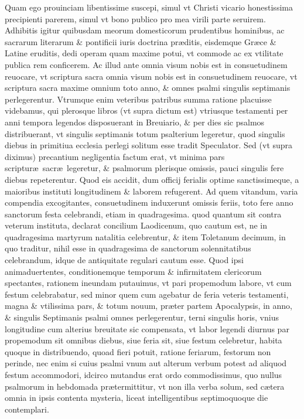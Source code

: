\documentclass[a5paper,10pt]{book}
\def\ae{æ}
\begin{document}
Quam ego prouinciam libentissime suscepi, simul vt Christi vicario honestissima precipienti parerem, simul vt bono publico pro mea virili parte seruirem.
Adhibitis igitur quibusdam meorum domesticorum prudentibus hominibus, ac sacrarum literarum \& pontificii iuris doctrina pr\ae ditis, eisdemque Gr\ae ce \& Latine eruditis, dedi operam quam %
maxime potui, vt commode ac ex vtilitate publica rem conficerem.
Ac illud ante omnia visum nobis est in consuetudinem reuocare, vt scriptura sacra omnia visum nobis est in consuetudinem reuocare, vt scriptura sacra maxime omnium toto anno, \& omnes %
psalmi singulis septimanis perlegerentur.%
Vtrumque enim veteribus patribus summa ratione placuisse videbamus, qui plerosque libros (vt supra dictum est) vtriusque testamenti per anni tempora legendos disposuerant in Breuiario, \& per dies sic psalmos distribuerant, vt singulis septimanis
totum psalterium legeretur, quod singulis diebus in primitiua ecclesia perlegi solitum esse tradit Speculator.
Sed (vt supra diximus) precantium negligentia factum erat, vt minima pars scriptur\ae \ sacr\ae \ legeretur, \& psalmorum plerisque omissis, pauci singulis fere diebus repeterentur.
Quod eis accidit, dum officij ferialis optime sanctissimeque, a maioribus instituti longitudinem \& laborem refugerent.
Ad quem vitandum, varia compendia excogitantes, consuetudinem induxerunt omissis feriis, toto fere anno sanctorum %
festa celebrandi, etiam in quadragesima.
quod %
quantum sit contra veterum instituta, declarat concilium Laodicenum, quo cautum est, ne in quadragesima martyrum natalitia celebrentur, \& item Toletanum decimum, in quo traditur, nihil esse in quadragesima de sanctorum %
solennitatibus %
celebrandum, idque de antiquitate regulari cautum esse.
Quod ipsi animaduertentes, conditionemque temporum \& infirmitatem clericorum spectantes, rationem ineundam putauimus, vt pari propemodum labore, vt cum festum celebrabatur, sed minor quem %
cum agebatur de feria veteris testamenti, magna \& vtilissima pars, \& totum nouum, pr\ae ter partem Apocalypsis, in anno, \& singulis Septimanis psalmi omnes perlegerentur, terni singulis horis, vnius longitudine cum alterius breuitate sic compensata, vt labor legendi diurnus par propemodum sit omnibus diebus, siue feria sit, siue festum celebretur, habita quoque in distribuendo, quoad fieri potuit, ratione feriarum, festorum non perinde, nec enim si cuius psalmi vnum aut alterum verbum potest ad aliquod festum accommodori, idcirco mutandus erat ordo commodissimus, quo nullus psalmorum in hebdomada pr\ae termittitur, vt non illa verba solum, sed c\ae tera omnia in ipsis contenta mysteria, liceat intelligentibus septimoquoque die contemplari.
\end{document}

